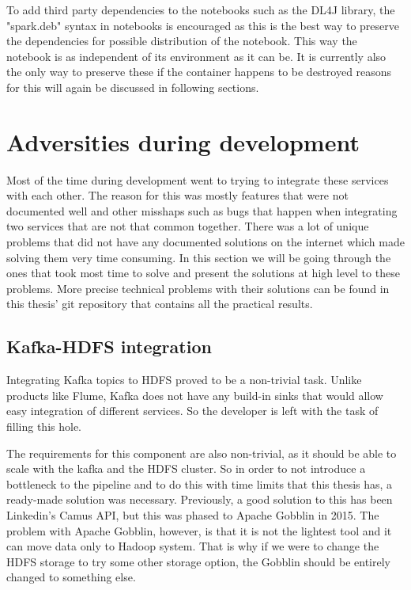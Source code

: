 To add third party dependencies to the notebooks such as the DL4J library, the "spark.deb" syntax in notebooks is encouraged as this is the best way to preserve the dependencies for possible distribution of the notebook.
This way the notebook is as independent of its environment as it can be.
It is currently also the only way to preserve these if the container happens to be destroyed reasons for this will again be discussed in following sections.

\section{Adversities during development}

Most of the time during development went to trying to integrate these services with each other.
The reason for this was mostly features that were not documented well and other misshaps such as bugs that happen when integrating two services that are not that common together.
There was a lot of unique problems that did not have any documented solutions on the internet which made solving them very time consuming.
In this section we will be going through the ones that took most time to solve and present the solutions at high level to these problems.
More precise technical problems with their solutions can be found in this thesis' git repository that contains all the practical results.

\subsection{Kafka-HDFS integration}

Integrating Kafka topics to HDFS proved to be a non-trivial task.
Unlike products like Flume, Kafka does not have any build-in sinks that would allow easy integration of different services.
So the developer is left with the task of filling this hole.

The requirements for this component are also non-trivial, as it should be able to scale with the kafka and the HDFS cluster.
So in order to not introduce a bottleneck to the pipeline and to do this with time limits that this thesis has, a ready-made solution was necessary.
Previously, a good solution to this has been Linkedin's Camus API, but this was phased to Apache Gobblin in 2015. 
The problem with Apache Gobblin, however, is that it is not the lightest tool and it can move data only to Hadoop system.
That is why if we were to change the HDFS storage to try some other storage option, the Gobblin should be entirely changed to something else.

